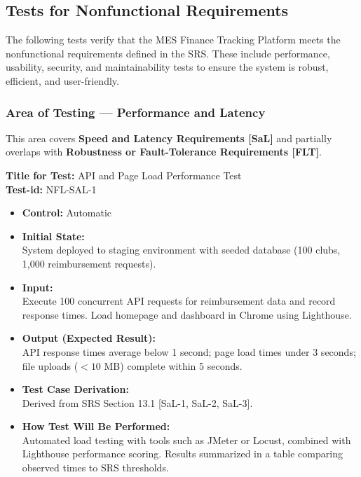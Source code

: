 \documentclass[12pt, titlepage]{article}
\begin{document}
\subsection{Tests for Nonfunctional Requirements}

The following tests verify that the MES Finance Tracking Platform meets the nonfunctional requirements defined in the SRS. These include performance, usability, security, and maintainability tests to ensure the system is robust, efficient, and user-friendly.

\subsubsection{Area of Testing — Performance and Latency}

This area covers \textbf{Speed and Latency Requirements [SaL]} and partially overlaps with \textbf{Robustness or Fault-Tolerance Requirements [FLT]}.

\textbf{Title for Test:} API and Page Load Performance Test \\
\textbf{Test-id:} NFL-SAL-1

\begin{itemize}
    \item \textbf{Control:} Automatic
    \item \textbf{Initial State:} \\
    System deployed to staging environment with seeded database (100 clubs, 1,000 reimbursement requests).
    \item \textbf{Input:} \\
    Execute 100 concurrent API requests for reimbursement data and record response times. Load homepage and dashboard in Chrome using Lighthouse.
    \item \textbf{Output (Expected Result):} \\
    API response times average below 1 second; page load times under 3 seconds; file uploads ($<10$ MB) complete within 5 seconds.
    \item \textbf{Test Case Derivation:} \\
    Derived from SRS Section 13.1 [SaL-1, SaL-2, SaL-3].
    \item \textbf{How Test Will Be Performed:} \\
    Automated load testing with tools such as JMeter or Locust, combined with Lighthouse performance scoring. Results summarized in a table comparing observed times to SRS thresholds.
\end{itemize}
\end{document}
